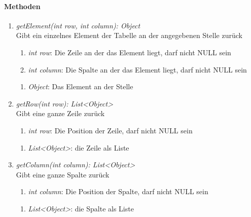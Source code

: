 		
\paragraph{Methoden}

\begin{enumerate}[+]
	\item \textit{getElement(int row, int column): Object} \\
	Gibt ein einzelnes Element der Tabelle an der angegebenen Stelle zurück
	\begin{enumerate}[$\bullet$]
		\item \textit{int row}: Die Zeile an der das Element liegt, darf nicht NULL sein
		\item \textit{int column}: Die Spalte an der das Element liegt, darf nicht NULL sein
	\end{enumerate}
	\vspace{-0.2cm}
	\begin{enumerate}[$\circ$]
		\item \textit{Object}: Das Element an der Stelle
	\end{enumerate}
	
	\item \textit{getRow(int row): List<Object>} \\
	Gibt eine ganze Zeile zurück
	\begin{enumerate}[$\bullet$]
		\item \textit{int row}: Die Position der Zeile, darf nicht NULL sein
	\end{enumerate}
	\vspace{-0.2cm}
	\begin{enumerate}[$\circ$]
		\item \textit{List<Object>}: die Zeile als Liste
	\end{enumerate}
	
	\item \textit{getColumn(int column): List<Object>} \\
	Gibt eine ganze Spalte zurück
	\begin{enumerate}[$\bullet$]
		\item \textit{int column}: Die Position der Spalte, darf nicht NULL sein
	\end{enumerate}
	\vspace{-0.2cm}
	\begin{enumerate}[$\circ$]
		\item \textit{List<Object>}: die Spalte als Liste
	\end{enumerate}
	

\end{enumerate}

